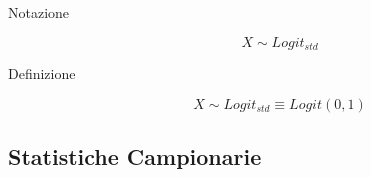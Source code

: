 \begin{description}

	\item [Notazione]
	\begin{equation}
		X \sim Logit_{std}
	\end{equation}
	
	\item [Definizione]
	\begin{equation}
		X \sim Logit_{std} \equiv Logit(0,1)
	\end{equation}
\end{description}


\subsection{Statistiche Campionarie}

